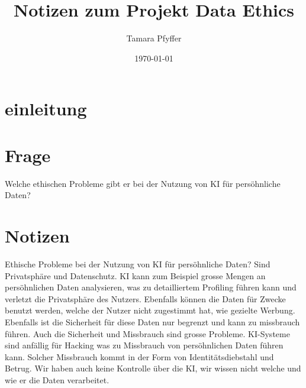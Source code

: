\documentclass{article}
\title{Notizen zum Projekt Data Ethics}
\author{Tamara Pfyffer}
\date{\today}
\begin{document}
\maketitle


\tableofcontents
\section{einleitung}


\section{Frage}
Welche ethischen Probleme gibt er bei der Nutzung von KI für persöhnliche Daten? 

\section{Notizen}
Ethische Probleme bei der Nutzung von KI für persöhnliche Daten?
Sind Privatsphäre und Datenschutz. KI kann zum Beispiel grosse Mengen an persöhnlichen Daten analysieren, was zu detailliertem Profiling führen kann und verletzt die Privatsphäre des Nutzers. Ebenfalls können die Daten für Zwecke benutzt werden, welche der Nutzer nicht zugestimmt hat, wie gezielte Werbung. Ebenfalls ist die Sicherheit für diese Daten nur begrenzt und kann zu missbrauch führen.
Auch die Sicherheit und Missbrauch sind grosse Probleme. KI-Systeme sind anfällig für Hacking was zu Missbrauch von persöhnlichen Daten führen kann. Solcher Missbrauch kommt in der Form von Identitätsdiebstahl und Betrug.
Wir haben auch keine Kontrolle über die KI, wir wissen nicht welche und wie er die Daten verarbeitet.


\printbibliography
\end{document}
